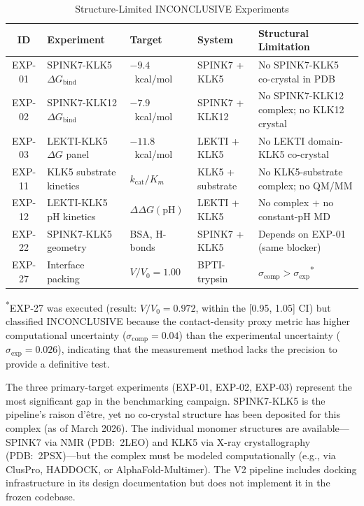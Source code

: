 \documentclass[conference]{IEEEtran}
\begin{document}
\begin{table}[H]
  \centering
  \caption{Structure-Limited INCONCLUSIVE Experiments}
  \label{tab:v3_struct}
  \footnotesize
  \begin{tabular}{@{}clllp{4.5cm}@{}}
    \toprule
    \textbf{ID} & \textbf{Experiment} & \textbf{Target} & \textbf{System} & \textbf{Structural Limitation} \\
    \midrule
    EXP-01 & SPINK7-KLK5 $\Delta G_{\mathrm{bind}}$ & $-9.4$~kcal/mol & SPINK7 + KLK5 & No SPINK7-KLK5 co-crystal in PDB \\
    EXP-02 & SPINK7-KLK12 $\Delta G_{\mathrm{bind}}$ & $-7.9$~kcal/mol & SPINK7 + KLK12 & No SPINK7-KLK12 complex; no KLK12 crystal \\
    EXP-03 & LEKTI-KLK5 $\Delta G$ panel & $-11.8$~kcal/mol & LEKTI + KLK5 & No LEKTI domain-KLK5 co-crystal \\
    EXP-11 & KLK5 substrate kinetics & $k_{\mathrm{cat}}/K_m$ & KLK5 + substrate & No KLK5-substrate complex; no QM/MM \\
    EXP-12 & LEKTI-KLK5 pH kinetics & $\Delta\Delta G(\mathrm{pH})$ & LEKTI + KLK5 & No complex + no constant-pH MD \\
    EXP-22 & SPINK7-KLK5 geometry & BSA, H-bonds & SPINK7 + KLK5 & Depends on EXP-01 (same blocker) \\
    EXP-27 & Interface packing & $V/V_0 = 1.00$ & BPTI-trypsin & $\sigma_{\mathrm{comp}} > \sigma_{\mathrm{exp}}$\textsuperscript{*} \\
    \bottomrule
  \end{tabular}
  \begin{flushleft}
    \textsuperscript{*}EXP-27 was executed (result: $V/V_0 = 0.972$, within
    the [0.95, 1.05] CI) but classified INCONCLUSIVE because the
    contact-density proxy metric has higher computational uncertainty
    ($\sigma_{\mathrm{comp}} = 0.04$) than the experimental uncertainty
    ($\sigma_{\mathrm{exp}} = 0.026$), indicating that the measurement
    method lacks the precision to provide a definitive test.
  \end{flushleft}
\end{table}

The three primary-target experiments (EXP-01, EXP-02, EXP-03) represent
the most significant gap in the benchmarking campaign.  SPINK7-KLK5 is
the pipeline's raison d'\^etre, yet no co-crystal structure has been
deposited for this complex (as of March 2026).  The individual monomer
structures are available---SPINK7 via NMR (PDB:~2LEO) and KLK5 via
X-ray crystallography (PDB:~2PSX)---but the complex must be modeled
computationally (e.g., via ClusPro, HADDOCK, or AlphaFold-Multimer).
The V2 pipeline includes docking infrastructure in its design
documentation but does not implement it in the frozen codebase.
\end{document}
